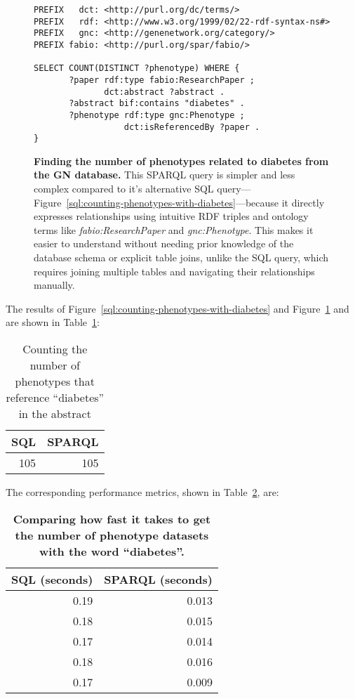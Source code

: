 \begin{figure}[H]
\centering
\begin{verbatim}
PREFIX   dct: <http://purl.org/dc/terms/>
PREFIX   rdf: <http://www.w3.org/1999/02/22-rdf-syntax-ns#>
PREFIX   gnc: <http://genenetwork.org/category/>
PREFIX fabio: <http://purl.org/spar/fabio/>

SELECT COUNT(DISTINCT ?phenotype) WHERE {
       ?paper rdf:type fabio:ResearchPaper ;
              dct:abstract ?abstract .
       ?abstract bif:contains "diabetes" .
       ?phenotype rdf:type gnc:Phenotype ;
                  dct:isReferencedBy ?paper .
}
\end{verbatim}
\caption[SPARQL Query to count the number of phenotypes with the word ``diabetes'']{\textbf{Finding the number of phenotypes related to diabetes from the GN database.}  This SPARQL query is simpler and less complex compared to it's alternative SQL query---Figure~\ref{sql:counting-phenotypes-with-diabetes}---because it directly expresses relationships using intuitive RDF triples and ontology terms like \textit{fabio:ResearchPaper} and \textit{gnc:Phenotype}.  This makes it easier to understand without needing prior knowledge of the database schema or explicit table joins, unlike the SQL query, which requires joining multiple tables and navigating their relationships manually.}\label{sparql:counting-phenotypes-with-diabetes}
\end{figure}

The results of Figure~\ref{sql:counting-phenotypes-with-diabetes} and Figure~\ref{sparql:counting-phenotypes-with-diabetes} and are shown in Table~\ref{table:counting-phenotypes-with-diabetes}:

\begin{table}[H]
\begin{tabular}{rr}
SQL & SPARQL \\[0pt]
\toprule
105 & 105\\[0pt]
\end{tabular}
\caption{Counting the number of phenotypes that reference ``diabetes'' in the abstract}\label{table:counting-phenotypes-with-diabetes}
\end{table}

The corresponding performance metrics, shown in Table~\ref{table:perf-2}, are:

\begin{table}[H]
\begin{tabular}{rr}
SQL (seconds) & SPARQL (seconds)\\[0pt]
\toprule
0.19 & 0.013\\[0pt]
0.18 & 0.015\\[0pt]
0.17 & 0.014\\[0pt]
0.18 & 0.016\\[0pt]
0.17 & 0.009\\[0pt]
\end{tabular}
\caption[Performance comparison in seconds: phenotype datasets related to diabetes (SQL vs SPARQL)]{\textbf{Comparing how fast it takes to get the number of phenotype datasets with the word ``diabetes''.}}\label{table:perf-2}
\end{table}

